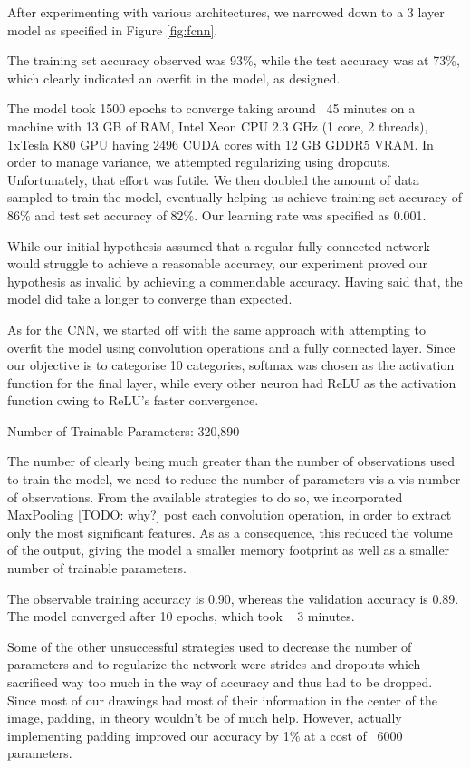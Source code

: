 \documentclass[12pt]{article}
\begin{document}
After experimenting with various architectures, we narrowed down to a 3 layer
model as specified in Figure \ref{fig:fcnn}.


The training set accuracy observed was 93\%, while the test accuracy was at
73\%, which clearly indicated an overfit in the model, as designed.

The model took 1500 epochs to converge taking around ~45 minutes on a
machine with 13 GB of RAM, Intel Xeon CPU 2.3 GHz (1 core, 2 threads),
1xTesla K80 GPU having 2496 CUDA cores with 12 GB GDDR5 VRAM. In order to
manage variance, we attempted regularizing using dropouts. Unfortunately,
that effort was futile. We then doubled the amount of data sampled to train
the model, eventually helping us achieve training set accuracy of 86\% and
test set accuracy of 82\%. Our learning rate was specified as 0.001.

While our initial hypothesis assumed that a regular fully connected network
would struggle to achieve a reasonable accuracy, our experiment proved our
hypothesis as invalid by achieving a commendable accuracy. Having said that,
the model did take a longer to converge than expected.

As for the CNN, we started off with the same approach with attempting to
overfit the model using convolution operations and a fully connected layer.
Since our objective is to categorise 10 categories, softmax was chosen as the
activation function for the final layer, while every other neuron had ReLU as
the activation function owing to ReLU’s faster convergence.




Number of Trainable Parameters: 320,890


The number of clearly being much greater than the number of observations used
to train the model, we need to reduce the number of parameters vis-a-vis
number of observations. From the available strategies to do so, we
incorporated MaxPooling [TODO: why?] post each convolution operation, in
order to extract only the most significant features. As as a consequence,
this reduced the volume of the output, giving the model a smaller memory
footprint as well as a smaller number of trainable parameters.


The observable training accuracy is 0.90, whereas the validation accuracy is
0.89. The model converged after 10 epochs, which took ~ 3 minutes.

Some of the other unsuccessful strategies used to decrease the number of
parameters and to regularize the network were strides and dropouts which
sacrificed way too much in the way of accuracy and thus had to be dropped.
Since most of our drawings had most of their information in the center of the
image, padding, in theory wouldn’t be of much help. However, actually
implementing padding improved our accuracy by 1\% at a cost of ~6000
parameters.
\end{document}
